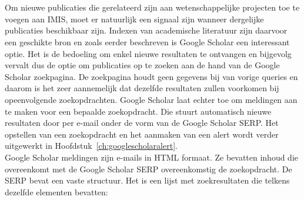 
\chapter{}%
\label{ch:methodologie}

Om nieuwe publicaties die gerelateerd zijn aan wetenschappelijke projecten toe te voegen aan IMIS, moet er natuurlijk een signaal zijn wanneer dergelijke publicaties beschikbaar zijn. Indexen van academische literatuur zijn daarvoor een geschikte bron en zoals eerder beschreven is Google Scholar een interessant optie. Het is de bedoeling om enkel nieuwe resultaten te ontvangen en bijgevolg vervalt dus de optie om publicaties op te zoeken aan de hand van de Google Scholar zoekpagina. De zoekpagina houdt geen gegevens bij van vorige queries en daarom is het zeer aannemelijk dat dezelfde resultaten zullen voorkomen bij opeenvolgende zoekopdrachten. Google Scholar laat echter toe om meldingen aan te maken voor een bepaalde zoekopdracht. Die stuurt automatisch nieuwe resultaten door per e-mail onder de vorm van de Google Scholar SERP. Het opstellen van een zoekopdracht en het aanmaken van een alert wordt verder uitgewerkt in Hoofdstuk~\ref{ch:googlescholaralert}.\\
Google Scholar meldingen zijn e-mails in HTML formaat. Ze bevatten inhoud die overeenkomt met de Google Scholar SERP overeenkomstig de zoekopdracht. De SERP bevat een vaste structuur. Het is een lijst met zoekresultaten die telkens dezelfde elementen bevatten:

